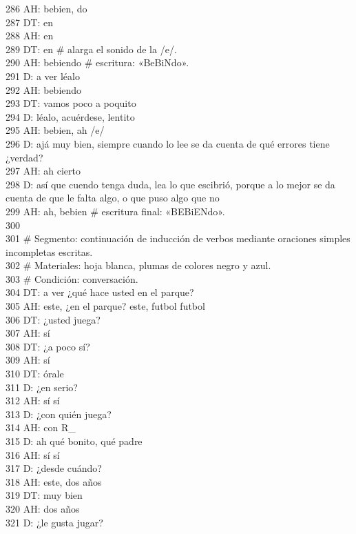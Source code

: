 286 AH: bebien, do\\
287 DT: en\\
288 AH: en\\
289 DT: en \# alarga el sonido de la /e/.\\
290 AH: bebiendo \# escritura: «BeBiNdo».\\
291 D: a ver léalo\\
292 AH: bebiendo\\
293 DT: vamos poco a poquito\\
294 D: léalo, acuérdese, lentito\\
295 AH: bebien, ah /e/\\
296 D: ajá muy bien, siempre cuando lo lee se da cuenta de qué errores tiene ¿verdad?\\
297 AH: ah cierto\\
298 D: así que cuendo tenga duda, lea lo que escibrió, porque a lo mejor se da cuenta de que le falta algo, o que puso algo que no\\
299 AH: ah, bebien \# escritura final: «BEBiENdo».\\
300 \\
301 \# Segmento: continuación de inducción de verbos mediante oraciones simples incompletas escritas.\\
302 \# Materiales: hoja blanca, plumas de colores negro y azul.\\
303 \# Condición: conversación.\\
304 DT: a ver ¿qué hace usted en el parque?\\
305 AH: este, ¿en el parque? este, futbol futbol\\
306 DT: ¿usted juega?\\
307 AH: sí\\
308 DT: ¿a poco sí?\\
309 AH: sí\\
310 DT: órale\\
311 D: ¿en serio?\\
312 AH: sí sí\\
313 D: ¿con quién juega?\\
314 AH: con R\_\\
315 D: ah qué bonito, qué padre\\
316 AH: sí sí\\
317 D: ¿desde cuándo?\\
318 AH: este, dos años\\
319 DT: muy bien\\
320 AH: dos años\\
321 D: ¿le gusta jugar?\\
